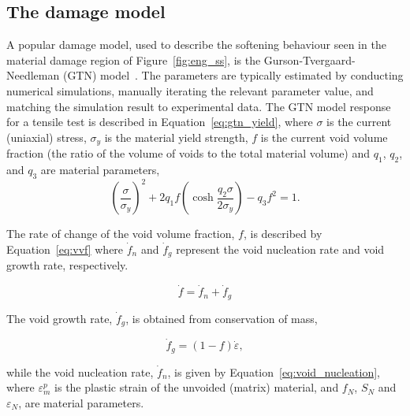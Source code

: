 \documentclass[preprint, review, 12pt]{elsarticle}
\begin{document}
	\subsection{The damage model}
	\label{h:damage_model}

	A popular damage model, used to describe the softening behaviour seen in the material damage region of Figure~\ref{fig:eng_ss}, is the Gurson-Tvergaard-Needleman (GTN) model~\cite{WCISLIK2016, CHAHBOUB2019, TVERGAARD1984a}.
	The parameters are typically estimated by conducting numerical simulations, manually iterating the relevant parameter value, and matching the simulation result to experimental data.
	The GTN model response for a tensile test is described in Equation~\ref{eq:gtn_yield}, where $\sigma$ is the current (uniaxial) stress, $\sigma_y$ is the material yield strength, $f$ is the current void volume fraction (the ratio of the volume of voids to the total material volume) and $q_1$, $q_2$, and $q_3$ are material parameters,
	\begin{equation}
		\left( \frac{\sigma}{\sigma_y} \right)^2 + 2q_{1}f\left( \cosh \frac{q_2 \sigma}{2\sigma_y} \right) - q_3 f^2 = 1.
		\label{eq:gtn_yield}
	\end{equation}

	The rate of change of the void volume fraction, $f$, is described by Equation~\ref{eq:vvf} where $\dot{f}_n$ and $\dot{f}_g$ represent the void nucleation rate and void growth rate, respectively.

	\begin{equation}
		\dot{f} = \dot{f}_n + \dot{f}_g
		\label{eq:vvf}
	\end{equation}

	The void growth rate, $\dot{f}_g$, is obtained from conservation of mass,

	\begin{equation}
		\dot{f}_g = (1-f)\dot{\varepsilon},
		\label{eq:void_growth}
	\end{equation}

	while the void nucleation rate, $\dot{f}_n$, is given by Equation~\ref{eq:void_nucleation}, where $\varepsilon^p_m$ is the plastic strain of the unvoided (matrix) material, and $f_N$, $S_N$ and $\varepsilon_N$, are material parameters.
\end{document}
